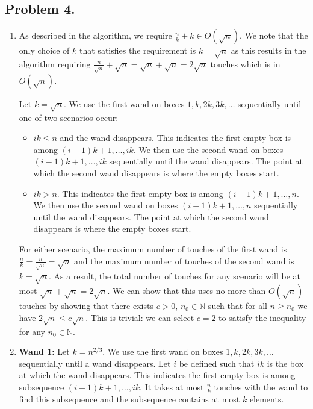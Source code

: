 \documentclass[11pt, letterpaper, titlepage]{article}
\begin{document}
\subsection*{Problem 4.}
\begin{enumerate}[label=\alph*)]
    \item As described in the algorithm, we require $\frac{n}{k} + k \in O(\sqrt{n})$. We note that the only choice of $k$ that satisfies the requirement is $k = \sqrt{n}$ as this results in the algorithm requiring $\frac{n}{\sqrt{n}} + \sqrt{n} = \sqrt{n} + \sqrt{n} = 2\sqrt{n}$ touches which is in $O(\sqrt{n})$.
    
    Let $k = \sqrt{n}$. We use the first wand on boxes $1, k, 2k, 3k, \ldots$ sequentially until one of two scenarios occur:
    \begin{itemize}
        \item $ik \leq n$ and the wand disappears. This indicates the first empty box is among $(i - 1)k + 1, \ldots, ik$. We then use the second wand on boxes $(i - 1)k + 1, \ldots, ik$ sequentially until the wand disappears. The point at which the second wand disappears is where the empty boxes start.
        \item $ik > n$. This indicates the first empty box is among $(i - 1)k + 1, \ldots, n$. We then use the second wand on boxes $(i - 1) k + 1, \ldots, n$ sequentially until the wand disappears. The point at which the second wand disappears is where the empty boxes start. 
    \end{itemize}
    For either scenario, the maximum number of touches of the first wand is $\frac{n}{k} = \frac{n}{\sqrt{n}} = \sqrt{n}$ and the maximum number of touches of the second wand is $k = \sqrt{n}$. As a result, the total number of touches for any scenario will be at most $\sqrt{n} + \sqrt{n} = 2\sqrt{n}$. We can show that this uses no more than $O(\sqrt{n})$ touches by showing that there exists $c > 0$, $n_0 \in \mathbb{N}$ such that for all $n \geq n_0$ we have $2\sqrt{n} \leq c\sqrt{n}$. This is trivial: we can select $c = 2$ to satisfy the inequality for any $n_0 \in \mathbb{N}$.

    \item \textbf{Wand 1:} Let $k = n^{2/3}$. We use the first wand on boxes $1, k, 2k, 3k, \ldots$ sequentially until a wand disappears. Let $i$ be defined such that $ik$ is the box at which the wand disappears. This indicates the first empty box is among subsequence $(i - 1)k + 1, \ldots, ik$. It takes at most $\frac{n}{k}$ touches with the wand to find this subsequence and the subsequence contains at most $k$ elements.
    

\end{enumerate}
\end{document}

